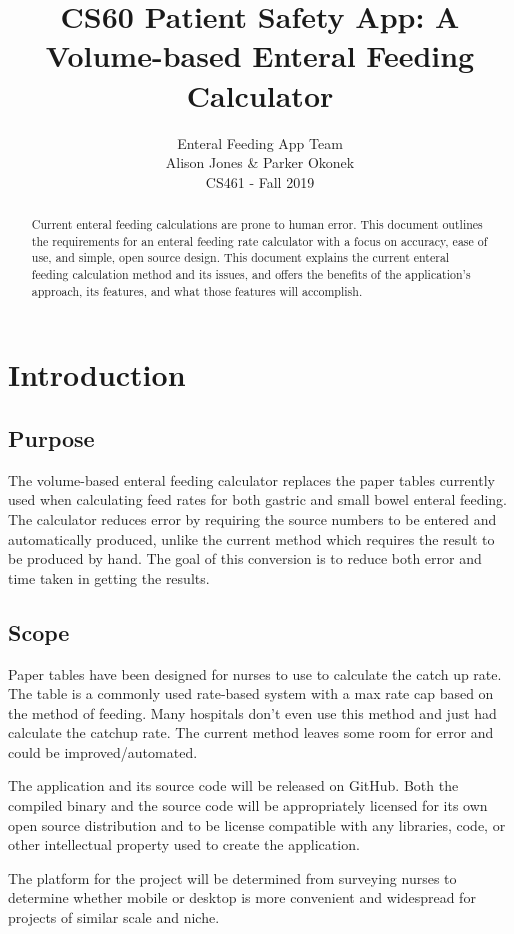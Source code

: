 \documentclass[fullpage,10pt, onecolumn, draftclsnofoot]{IEEEtran}
\title{CS60 Patient Safety App: A Volume-based Enteral Feeding Calculator}
\author{Enteral Feeding App Team\\ Alison Jones \& Parker Okonek \\ CS461 - Fall 2019}
\begin{document}
\maketitle
\begin{abstract}
Current enteral feeding calculations are prone to human error. This document outlines the requirements for
an enteral feeding rate calculator with a focus on accuracy, ease of use, and simple, open source design.
 This document explains the current enteral feeding calculation method and its issues, and offers the 
 benefits of the application's approach, its features, and what those features will accomplish.
\end{abstract}
\newpage

\section{Introduction}

\subsection{Purpose}
The volume-based enteral feeding calculator replaces the paper tables currently used when 
calculating feed rates for both gastric and small bowel enteral feeding. The calculator reduces
error by requiring the source numbers to be entered and automatically produced, unlike the current
method which requires the result to be produced by hand. The goal of this conversion is to reduce both
error and time taken in getting the results.

\subsection{Scope}
Paper tables have been designed for nurses to use to calculate the catch up rate. The table is a commonly used rate-based system with a max rate cap based on the method of feeding. Many hospitals don't even use this method and just had calculate the catchup rate. The current method leaves some room for error and could be improved/automated.

The application and its source code will be released on GitHub. Both the compiled binary and the source code
will be appropriately licensed for its own open source distribution and to be license compatible with any 
libraries, code, or other intellectual property used to create the application.

The platform for the project will be determined from surveying nurses to determine whether mobile or desktop
is more convenient and widespread for projects of similar scale and niche.
\end{document}
